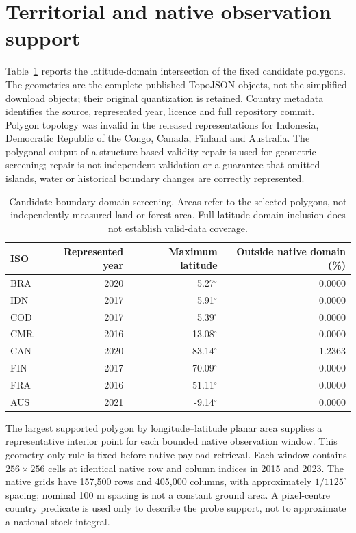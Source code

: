 \documentclass[11pt,a4paper]{article}
\begin{document}
\section{Territorial and native observation support}

Table~\ref{tab:domain} reports the latitude-domain intersection of the fixed candidate polygons. The geometries are the complete published TopoJSON objects, not the simplified-download objects; their original quantization is retained. Country metadata identifies the source, represented year, licence and full repository commit. Polygon topology was invalid in the released representations for Indonesia, Democratic Republic of the Congo, Canada, Finland and Australia. The polygonal output of a structure-based validity repair is used for geometric screening; repair is not independent validation or a guarantee that omitted islands, water or historical boundary changes are correctly represented.

\begin{table}[htbp]
\centering\small
\caption{Candidate-boundary domain screening. Areas refer to the selected polygons, not independently measured land or forest area. Full latitude-domain inclusion does not establish valid-data coverage.}\label{tab:domain}
\begin{tabular}{lrrr}
\toprule
ISO & Represented year & Maximum latitude & Outside native domain (\%)\\\midrule
BRA & 2020 & 5.27$^\circ$ & 0.0000 \\
IDN & 2017 & 5.91$^\circ$ & 0.0000 \\
COD & 2017 & 5.39$^\circ$ & 0.0000 \\
CMR & 2016 & 13.08$^\circ$ & 0.0000 \\
CAN & 2020 & 83.14$^\circ$ & 1.2363 \\
FIN & 2017 & 70.09$^\circ$ & 0.0000 \\
FRA & 2016 & 51.11$^\circ$ & 0.0000 \\
AUS & 2021 & -9.14$^\circ$ & 0.0000 \\
\bottomrule
\end{tabular}
\end{table}

The largest supported polygon by longitude--latitude planar area supplies a representative interior point for each bounded native observation window. This geometry-only rule is fixed before native-payload retrieval. Each window contains $256\times256$ cells at identical native row and column indices in 2015 and 2023. The native grids have 157,500 rows and 405,000 columns, with approximately $1/1125^\circ$ spacing; nominal 100 m spacing is not a constant ground area. A pixel-centre country predicate is used only to describe the probe support, not to approximate a national stock integral.
\end{document}
